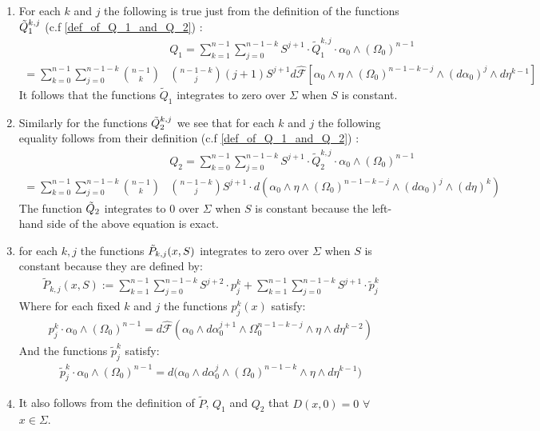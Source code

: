 \documentclass[11pt]{amsart}
\theoremstyle{plain}
\theoremstyle{definition}
\theoremstyle{remark}
\begin{document}
\begin{enumerate}
    \item For each $k$ and $j$ the following is true just from the definition of the functions $\Tilde{Q}^{k,j}_1$ (c.f \eqref{def_of_Q_1_and_Q_2}) :
    \begin{align}
   &Q_1 = \sum_{k=1}^{n-1} \sum_{j=0}^{n-1-k} S^{j+1} \cdot  \tilde{Q}^{k,j}_1 \cdot \alpha_0 \wedge (\Omega_0)^{n-1}  \\\nonumber =
 \sum_{k=0}^{n-1}   \sum^{n-1-k}_{j=0} \binom{n-1}{k} &\binom{n-1-k}{j} (j+1) S^{j+1} d\hat{\mathcal{F}}[\alpha_0 \wedge \eta \wedge (\Omega_0)^{n-1-k-j} \wedge (d\alpha_0)^{j} \wedge d\eta^{k-1}]
    \end{align}
    It follows that the functions $\tilde{Q}_1$ integrates to zero over $\Sigma$ when $S$ is constant.\\
    
    \item Similarly for the functions $ \Tilde{Q}^{k,j}_2$ we see that for each $k$ and $j$ the following equality follows from their definition (c.f \eqref{def_of_Q_1_and_Q_2}) :
    \begin{align}
    &Q_2 = \sum_{k=0}^{n-1}   \sum^{n-1-k}_{j=0}   S^{j+1} \cdot \tilde{Q}^{k,j}_2 \cdot \alpha_0 \wedge (\Omega_0)^{n-1}  \\\nonumber =
 \sum_{k=0}^{n-1}   \sum^{n-1-k}_{j=0} \binom{n-1}{k} &\binom{n-1-k}{j} S^{j+1} \cdot d( \alpha_0 \wedge \eta  \wedge (\Omega_0)^{n-1-k-j} \wedge (d\alpha_0)^j \wedge  (d\eta)^{k})
    \end{align}
   The function $\Tilde{Q}_2$ integrates to $0$ over $\Sigma$ when $S$ is constant because the left-hand side of the above equation is exact.
    \item for each $k,j$ the functions $\Tilde{P}_{k,j}(x,S)$ integrates to zero over $\Sigma$ when $S$ is constant because they are defined by:
\begin{align*}
    \tilde{P}_{k,j}(x,S):= \sum^{n-1}_{k=1} \sum^{n-1-k}_{j=0} S^{j+2} \cdot p^k_j + \sum^{n-1}_{k=1} \sum^{n-1-k}_{j=0} S^{j+1} \cdot \tilde{p}^k_j
\end{align*}
    Where for each fixed $k$ and $j$ the functions $p^k_j(x)$ satisfy:
    \begin{align}
    p^k_j \cdot \alpha_0 \wedge (\Omega_0)^{n-1} = d\hat{\mathcal{F}}(\alpha_0 \wedge d\alpha^{j+1}_0 \wedge \Omega^{n-1-k-j}_0 \wedge \eta \wedge d\eta^{k-2})
\end{align}
    And the functions $\tilde{p}^k_j$ satisfy:
    \begin{align}
    \tilde{p}^k_j \cdot \alpha_0 \wedge (\Omega_0)^{n-1} = d\big(\alpha_0 \wedge d\alpha^j_0 \wedge (\Omega_0)^{n-1-k}\wedge \eta \wedge d\eta^{k-1}\big)
\end{align}
\item It also follows from the definition of $\tilde{P}$, $Q_1$ and $Q_2$ that $D(x,0) = 0$ $\forall$ $x \in \Sigma$.
\end{enumerate}
\end{document}
